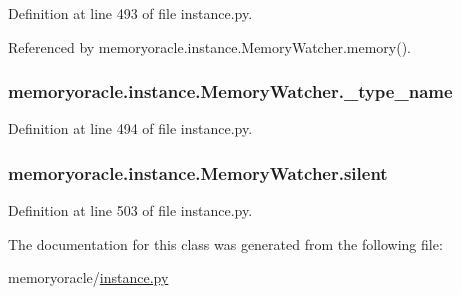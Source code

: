 Definition at line 493 of file instance.\+py.



Referenced by memoryoracle.\+instance.\+Memory\+Watcher.\+memory().

\hypertarget{classmemoryoracle_1_1instance_1_1MemoryWatcher_aabd67feb966e0ed002597f497b8f1fb4}{}
\subsubsection[{\+\_\+type\+\_\+name}]{\setlength{\rightskip}{0pt plus 5cm}memoryoracle.\+instance.\+Memory\+Watcher.\+\_\+type\+\_\+name\hspace{0.3cm}{\ttfamily [private]}}\label{classmemoryoracle_1_1instance_1_1MemoryWatcher_aabd67feb966e0ed002597f497b8f1fb4}


Definition at line 494 of file instance.\+py.

\hypertarget{classmemoryoracle_1_1instance_1_1MemoryWatcher_af476be1c5fbde61b5d06eaabdcf74f9c}{}
\subsubsection[{silent}]{\setlength{\rightskip}{0pt plus 5cm}memoryoracle.\+instance.\+Memory\+Watcher.\+silent}\label{classmemoryoracle_1_1instance_1_1MemoryWatcher_af476be1c5fbde61b5d06eaabdcf74f9c}


Definition at line 503 of file instance.\+py.



The documentation for this class was generated from the following file\+:\begin{DoxyCompactItemize}
\item 
memoryoracle/\hyperlink{instance_8py}{instance.\+py}\end{DoxyCompactItemize}
